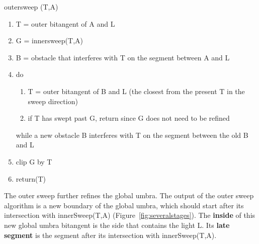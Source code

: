 \documentclass[9pt]{article}
\begin{document}
\vspace{.2in}

\centerline{outersweep (T,A)}

\begin{enumerate}
\item T = outer bitangent of A and L
\item G = innersweep(T,A)
\item B = obstacle that interferes with T on the segment between A and L
\item do
\begin{enumerate}
\item T = outer bitangent of B and L (the closest from the present T in the
	sweep direction)
\item if T has swept past G, return since G does not need to be refined
\end{enumerate}
while a new obstacle B interferes with T on the segment between the old B and L
\item clip G by T 
\item return(T)
\end{enumerate}

The outer sweep further refines the global umbra.
The output of the outer sweep algorithm is a new boundary of the global
umbra, which should start after its intersection with 
innerSweep(T,A) (Figure~\ref{fig:severalstages}).
The {\bf inside} of this new global umbra bitangent 
is the side that contains the light L.
Its {\bf late segment} is the segment after its intersection with 
innerSweep(T,A).




\end{document}
